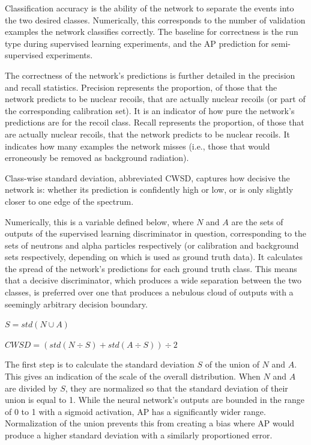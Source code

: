 \documentclass[10pt]{article}
\begin{document}
Classification accuracy is the ability of the network to separate the events into the two desired classes. Numerically, this corresponds to the number of validation examples the network classifies correctly. The baseline for correctness is the run type during supervised learning experiments, and the AP prediction for semi-supervised experiments.

The correctness of the network's predictions is further detailed in the precision and recall statistics. Precision represents the proportion, of those that the network predicts to be nuclear recoils, that are actually nuclear recoils (or part of the corresponding calibration set). It is an indicator of how pure the network's predictions are for the recoil class. Recall represents the proportion, of those that are actually nuclear recoils, that the network predicts to be nuclear recoils. It indicates how many examples the network misses (i.e., those that would erroneously be removed as background radiation).

Class-wise standard deviation, abbreviated CWSD, captures how decisive the network is: whether its prediction is confidently high or low, or is only slightly closer to one edge of the spectrum.

Numerically, this is a variable defined below, where $N$ and $A$ are the sets of outputs of the supervised learning discriminator in question, corresponding to the sets of neutrons and alpha particles respectively (or calibration and background sets respectively, depending on which is used as ground truth data). It calculates the spread of the network's predictions for each ground truth class. This means that a decisive discriminator, which produces a wide separation between the two classes, is preferred over one that produces a nebulous cloud of outputs with a seemingly arbitrary decision boundary.

$S=std(N \cup A)$

$CWSD=(std(N \div S) + std(A \div S)) \div 2$

The first step is to calculate the standard deviation $S$ of the union of $N$ and $A$. This gives an indication of the scale of the overall distribution. When $N$ and $A$ are divided by $S$, they are normalized so that the standard deviation of their union is equal to 1. While the neural network’s outputs are bounded in the range of 0 to 1 with a sigmoid activation, AP has a significantly wider range. Normalization of the union prevents this from creating a bias where AP would produce a higher standard deviation with a similarly proportioned error.
\end{document}
